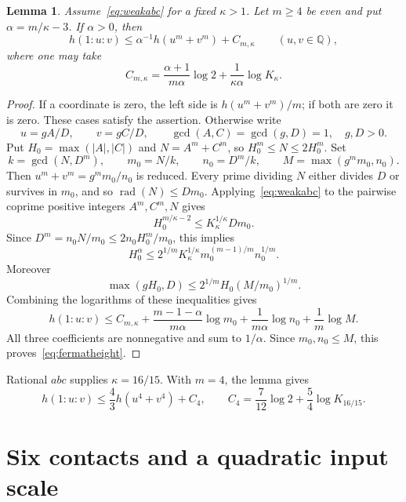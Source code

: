 \documentclass[11pt,a4paper]{article}
\newtheorem{lemma}[theorem]{Lemma}
\theoremstyle{remark}\newtheorem{remark}[theorem]{Remark}
\newcommand{\Q}{\mathbb Q}\newcommand{\Z}{\mathbb Z}
\DeclareMathOperator{\rad}{rad}
\begin{document}
\begin{lemma}\label{lem:fermat}
Assume~\eqref{eq:weakabc} for a fixed $\kappa>1$.
Let $m\ge4$ be even and put $\alpha=m/\kappa-3$.
If $\alpha>0$, then
\begin{equation}\label{eq:fermatheight}
 h(1:u:v)\le\alpha^{-1}h(u^m+v^m)+C_{m,\kappa}
 \qquad(u,v\in\Q),
\end{equation}
where one may take
\[
 C_{m,\kappa}=\frac{\alpha+1}{m\alpha}\log2
                       +\frac{1}{\kappa\alpha}\log K_\kappa.
\]
\end{lemma}
\begin{proof}
If a coordinate is zero, the left side is $h(u^m+v^m)/m$;
if both are zero it is zero. These cases satisfy the assertion.
Otherwise write
\[
 u=gA/D,\qquad v=gC/D,
 \qquad \gcd(A,C)=\gcd(g,D)=1,\quad g,D>0.
\]
Put $H_0=\max(|A|,|C|)$ and $N=A^m+C^m$, so
$H_0^m\le N\le2H_0^m$. Set
\[
 k=\gcd(N,D^m),\qquad m_0=N/k,\qquad n_0=D^m/k,
 \qquad M=\max(g^m m_0,n_0).
\]
Then $u^m+v^m=g^m m_0/n_0$ is reduced. Every prime dividing
$N$ either divides $D$ or survives in $m_0$, and so
$\rad(N)\le Dm_0$. Applying~\eqref{eq:weakabc} to the
pairwise coprime positive integers $A^m,C^m,N$ gives
\[
 H_0^{m/\kappa-2}\le K_\kappa^{1/\kappa}Dm_0.
\]
Since $D^m=n_0N/m_0\le2n_0H_0^m/m_0$, this implies
\[
 H_0^\alpha\le2^{1/m}K_\kappa^{1/\kappa}
                         m_0^{(m-1)/m}n_0^{1/m}.
\]
Moreover
\[
 \max(gH_0,D)\le2^{1/m}H_0(M/m_0)^{1/m}.
\]
Combining the logarithms of these inequalities gives
\[
 h(1:u:v)\le C_{m,\kappa}
 +\frac{m-1-\alpha}{m\alpha}\log m_0
 +\frac{1}{m\alpha}\log n_0+\frac1m\log M.
\]
All three coefficients are nonnegative and sum to $1/\alpha$.
Since $m_0,n_0\le M$, this proves~\eqref{eq:fermatheight}.
\end{proof}

Rational $abc$ supplies $\kappa=16/15$. With $m=4$, the
lemma gives
\begin{equation}\label{eq:fourthheight}
 h(1:u:v)\le\frac43h(u^4+v^4)+C_4,
 \qquad C_4=\frac7{12}\log2+\frac54\log K_{16/15}.
\end{equation}

\section{Six contacts and a quadratic input scale}
\end{document}
